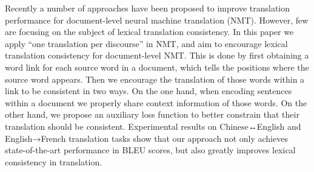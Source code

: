 Recently a  number of approaches have been proposed to improve translation performance for document-level neural machine translation (NMT). However, few are focusing on the subject of lexical translation consistency.  In this paper we apply ``one translation per discourse'' in  NMT,  and aim to encourage lexical translation consistency for document-level  NMT. This is done by first obtaining a  word link for each source word in a  document,  which tells the positions where the source word appears. Then we encourage the translation of those words within a link to be consistent in two ways. On the one hand,  when encoding sentences within a document we properly share context information of those words.  On the other hand,  we propose an auxiliary loss function to better constrain that their translation should be consistent. Experimental results on Chinese↔English and English→French translation tasks show that our approach not only achieves state-of-the-art performance in BLEU scores, but also greatly improves lexical consistency in translation.
